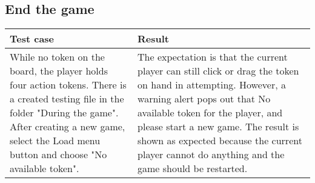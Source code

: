 \subsection{End the game}

\begin{table}[h]
	\centering
	\begin{tabular}{p{7cm}@{\hskip 5mm}  p{7cm}} 
		\toprule
		Test case   & Result   \\ 
		\midrule
		\midrule
		While no token on the board, the player holds four action tokens. There is a created testing file in the folder "During the game". After creating a new game, select the Load menu button and choose "No available token".  & The expectation is that the current player can still click or drag the token on hand in attempting. However, a warning alert pops out that No available token for the player, and please start a new game.  The result is shown as expected because the current player cannot do anything and the game should be restarted.   \\ 
		\bottomrule
	\end{tabular}
\end{table}